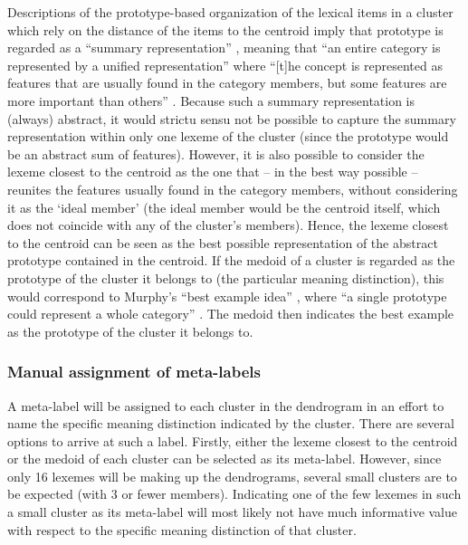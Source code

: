 Descriptions of the prototype-based organization of the lexical items in a cluster which rely on the distance of the items to the centroid imply that prototype is regarded as a “summary representation” \citep[42]{murphy_big_2004}, meaning that “an entire category is represented by a unified representation” where “[t]he concept is represented as features that are usually found in the category members, but some features are more important than others” \citep[42]{murphy_big_2004}. Because such a summary representation is (always) abstract, it would strictu sensu not be possible to capture the summary representation within only one lexeme of the cluster (since the prototype would be an abstract sum of features). However, it is also possible to consider the lexeme closest to the centroid as the one that – in the best way possible – reunites the features usually found in the category members, without considering it as the ‘ideal member’ (the ideal member would be the centroid itself, which does not coincide with any of the cluster’s members). Hence, the lexeme closest to the centroid can be seen as the best possible representation of the abstract prototype contained in the centroid. If the medoid of a cluster is regarded as the prototype of the cluster it belongs to (the particular meaning distinction), this would correspond to Murphy’s “best example idea” \citep[42]{murphy_big_2004}, where “a single prototype could represent a whole category” \citep[42]{murphy_big_2004}. The medoid then indicates the best example as the prototype of the cluster it belongs to.

\subsubsection{Manual assignment of meta-labels}
\label{sec:3.8.1.4}  

A meta-label will be assigned to each cluster in the dendrogram in an effort to name the specific meaning distinction indicated by the cluster. There are several options to arrive at such a label. Firstly, either the lexeme closest to the centroid or the medoid of each cluster can be selected as its meta-label. However, since only 16 lexemes will be making up the dendrograms, several small clusters are to be expected (with 3 or fewer members). Indicating one of the few lexemes in such a small cluster as its meta-label will most likely not have much informative value with respect to the specific meaning distinction of that cluster.

